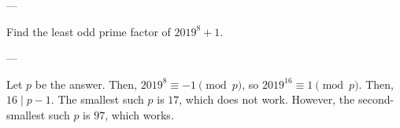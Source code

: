 
---

Find the least odd prime factor of $2019^8+1$.

---

Let $p$ be the answer. Then, $2019^8\equiv -1\pmod p$, so $2019^{16}\equiv 1\pmod p$. Then, $16\mid p-1$. The smallest such $p$ is $17$, which does not work. However, the second-smallest such $p$ is $97$, which works.

